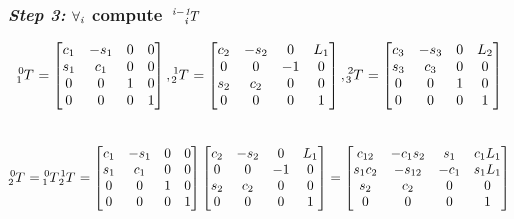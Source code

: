 \documentclass[10pt]{article}
\begin{document}
\subsubsection*{\textit{\textbf{Step 3: }}$\bf{\it{\forall_{i}}}$ compute $\bf{\it{ \tensor*[^{i-1}_{i}]{T}{}}}$}
\[
\tensor*[^{0}_{1}]{T}{} =
\begin{bmatrix}
    c_{1}        & -s_{1}       & 0     & 0      \\
    s_{1}        & c_{1}        & 0     & 0      \\
    0            & 0            & 1     & 0      \\
    0            & 0            & 0     & 1
\end{bmatrix}, 
\tensor*[^{1}_{2}]{T}{} =
\begin{bmatrix}
    c_{2}        & -s_{2}       & 0     & L_{1}  \\
    0            & 0            & -1    & 0      \\
    s_{2}        & c_{2}        & 0     & 0      \\
    0            & 0            & 0     & 1
\end{bmatrix}, 
\tensor*[^{2}_{3}]{T}{} =
\begin{bmatrix}
    c_{3}        & -s_{3}       & 0     & L_{2}  \\
    s_{3}        & c_{3}        & 0     & 0      \\
    0            & 0            & 1     & 0      \\
    0            & 0            & 0     & 1
\end{bmatrix}\] \\
\[
\tensor*[^{0}_{2}]{T}{} = 
\tensor*[^{0}_{1}]{T}{} \tensor*[^{1}_{2}]{T}{} = 
\begin{bmatrix}
    c_{1}        & -s_{1}       & 0     & 0      \\
    s_{1}        & c_{1}        & 0     & 0      \\
    0            & 0            & 1     & 0      \\
    0            & 0            & 0     & 1
\end{bmatrix}
\begin{bmatrix}
    c_{2}        & -s_{2}       & 0     & L_{1}  \\
    0            & 0            & -1    & 0      \\
    s_{2}        & c_{2}        & 0     & 0      \\
    0            & 0            & 0     & 1
\end{bmatrix} =
\begin{bmatrix}
    c_{12}       & -c_{1}s_{2}  & s_{1} & c_{1}L_{1}     \\
    s_{1}c_{2}   & -s_{12}      & -c_{1}& s_{1}L_{1}     \\
    s_{2}        & c_{2}        & 0     & 0      \\
    0            & 0            & 0     & 1
\end{bmatrix}
\] \\
\end{document}
